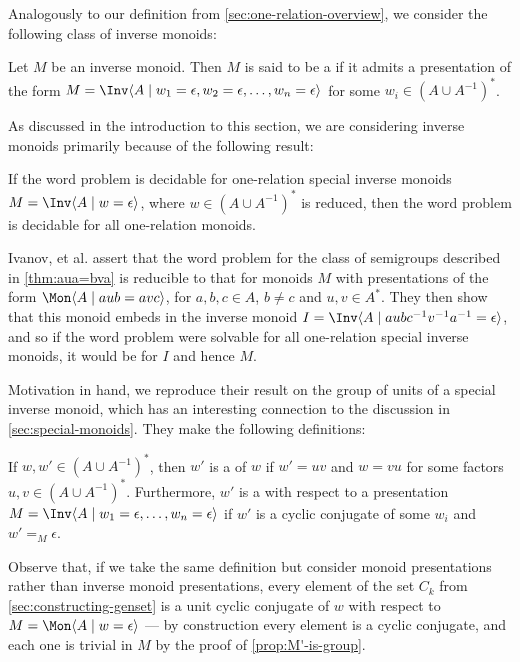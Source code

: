 \documentclass[noindex,noinsetproof,12pt]{lmaths}
\begin{document}
Analogously to our definition from \cref{sec:one-relation-overview}, we consider the following class of inverse monoids:
\begin{defn}
	Let $M$ be an inverse monoid. Then $M$ is said to be a  if it admits a presentation of the form $M = \Inv \langle A \mid w_1 = \epsilon, w_2 = \epsilon, \ldots, w_n = \epsilon \rangle$ for some $w_i \in (A \cup A^{-1})^*$.
\end{defn}

As discussed in the introduction to this section, we are considering inverse monoids primarily because of the following result:
\begin{theorem}
	If the word problem is decidable for one-relation special inverse monoids $M = \Inv \langle A \mid w = \epsilon\rangle$, where $w \in (A \cup A^{-1})^*$ is reduced, then the word problem is decidable for all one-relation monoids.
\end{theorem}

Ivanov, et al. assert that the word problem for the class of semigroups described in \cref{thm:aua=bva} is reducible to that for monoids $M$ with presentations of the form $\Mon \langle A \mid aub = avc \rangle$, for $a, b, c \in A$, $b \ne c$ and $u, v \in A^*$. They then show that this monoid embeds in the inverse monoid $I = \Inv \langle A \mid aubc^{-1}v^{-1}a^{-1} = \epsilon\rangle$, and so if the word problem were solvable for all one-relation special inverse monoids, it would be for $I$ and hence $M$.


Motivation in hand, we reproduce their result on the group of units of a special inverse monoid, which has an interesting connection to the discussion in \cref{sec:special-monoids}. They make the following definitions:

\begin{defn}
	If $w, w' \in (A \cup A^{-1})^*$, then $w'$ is a  of $w$ if $w' = uv$ and $w = vu$ for some factors $u, v \in (A \cup A^{-1})^*$. Furthermore, $w'$ is a  with respect to a presentation $M = \Inv \langle A \mid w_1 = \epsilon, \ldots, w_n = \epsilon \rangle$ if $w'$ is a cyclic conjugate of some $w_i$ and $w' =_M \epsilon$.
\end{defn}

Observe that, if we take the same definition but consider monoid presentations rather than inverse monoid presentations, every element of the set $C_k$ from \cref{sec:constructing-genset} is a unit cyclic conjugate of $w$ with respect to $M = \Mon \langle A \mid w = \epsilon \rangle$ --- by construction every element is a cyclic conjugate, and each one is trivial in $M$ by the proof of \cref{prop:M'-is-group}.
\end{document}
